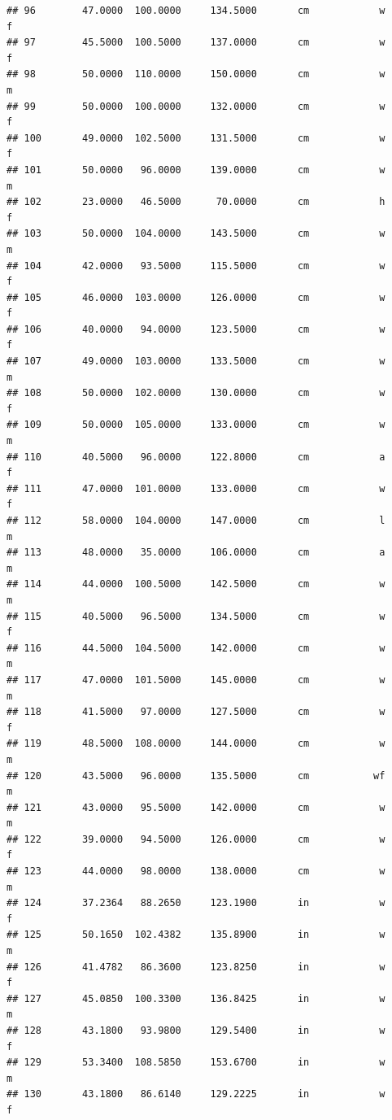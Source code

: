 \documentclass[]{article}
\begin{document}
\begin{verbatim}
## 96        47.0000  100.0000     134.5000       cm            w         f
## 97        45.5000  100.5000     137.0000       cm            w         f
## 98        50.0000  110.0000     150.0000       cm            w         m
## 99        50.0000  100.0000     132.0000       cm            w         f
## 100       49.0000  102.5000     131.5000       cm            w         f
## 101       50.0000   96.0000     139.0000       cm            w         m
## 102       23.0000   46.5000      70.0000       cm            h         f
## 103       50.0000  104.0000     143.5000       cm            w         m
## 104       42.0000   93.5000     115.5000       cm            w         f
## 105       46.0000  103.0000     126.0000       cm            w         f
## 106       40.0000   94.0000     123.5000       cm            w         f
## 107       49.0000  103.0000     133.5000       cm            w         m
## 108       50.0000  102.0000     130.0000       cm            w         f
## 109       50.0000  105.0000     133.0000       cm            w         m
## 110       40.5000   96.0000     122.8000       cm            a         f
## 111       47.0000  101.0000     133.0000       cm            w         f
## 112       58.0000  104.0000     147.0000       cm            l         m
## 113       48.0000   35.0000     106.0000       cm            a         m
## 114       44.0000  100.5000     142.5000       cm            w         m
## 115       40.5000   96.5000     134.5000       cm            w         f
## 116       44.5000  104.5000     142.0000       cm            w         m
## 117       47.0000  101.5000     145.0000       cm            w         m
## 118       41.5000   97.0000     127.5000       cm            w         f
## 119       48.5000  108.0000     144.0000       cm            w         m
## 120       43.5000   96.0000     135.5000       cm           wf         m
## 121       43.0000   95.5000     142.0000       cm            w         m
## 122       39.0000   94.5000     126.0000       cm            w         f
## 123       44.0000   98.0000     138.0000       cm            w         m
## 124       37.2364   88.2650     123.1900       in            w         f
## 125       50.1650  102.4382     135.8900       in            w         m
## 126       41.4782   86.3600     123.8250       in            w         f
## 127       45.0850  100.3300     136.8425       in            w         m
## 128       43.1800   93.9800     129.5400       in            w         f
## 129       53.3400  108.5850     153.6700       in            w         m
## 130       43.1800   86.6140     129.2225       in            w         f

\end{verbatim}
\end{document}
